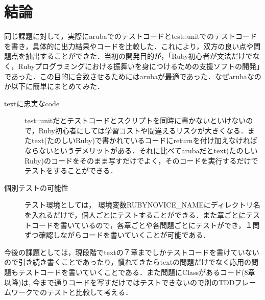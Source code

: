
\section{結論}
同じ課題に対して，実際にarubaでのテストコードとtest::unitでのテストコードを書き，具体的に出力結果やコードを比較した．これにより，双方の良い点や問題点を抽出することができた．当初の開発目的が，「Ruby初心者が文法だけでなく，Rubyプログラミングにおける振舞いを身につけるための支援ソフトの開発」であった．この目的に合致させるためにはarubaが最適であった．なぜarubaなのか以下に簡単にまとめてみた．
\begin{description}
\item[textに忠実なcode] test::unitだとテストコードとスクリプトを同時に書かないといけないので，Ruby初心者にしては学習コストや間違えるリスクが大きくなる．またtext(たのしいRuby)で書かれているコードにreturnを付け加えなければならないというデメリットがある．それに比べてarubaだとtext(たのしいRuby)のコードをそのまま写すだけでよく，そのコードを実行するだけでテストをすることができる．

\end{description}\begin{description}
\item[個別テストの可能性] テスト環境としては， 環境変数RUBYNOVICE\_NAMEにディレクトリ名を入れるだけで，個人ごとにテストすることができる．また章ごとにテストコードを書いているので，各章ごとや各問題ごとにテストができ，１問ずつ確認しながらコードを書いていくことが可能である．

\end{description}
今後の課題としては，現段階でtextの７章までしかテストコードを書けていないので引き続き書くことであったり，慣れてきたらtextの問題だけでなく応用の問題もテストコードを書いていくことである．また問題にClassがあるコード(8章以降)は, 今まで通りコードを写すだけではテストできないので別のTDDフレームワークでのテストと比較して考える．


